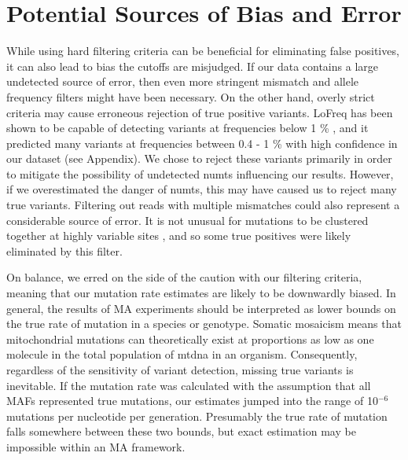 \documentclass[12pt,twoside]{reedthesis}
\begin{document}

\section{Potential Sources of Bias and Error}
While using hard filtering criteria can be beneficial for eliminating false positives, it can also lead to bias the cutoffs are misjudged.
If our data contains a large undetected source of error, then even more stringent mismatch and allele frequency filters might have been necessary.
On the other hand, overly strict criteria may cause erroneous rejection of true positive variants. 
LoFreq has been shown to be capable of detecting variants at frequencies below 1 \% \citep{wilm_lofreq:_2012, huang_evaluation_2015}, and it predicted many variants at frequencies between 0.4 - 1 \% with high confidence in our dataset (see Appendix). 
We chose to reject these variants primarily in order to mitigate the possibility of undetected \gls{numts} influencing our results.
However, if we overestimated the danger of \gls{numts}, this may have caused us to reject many true variants.
Filtering out reads with multiple mismatches could also represent a considerable source of error. 
It is not unusual for mutations to be clustered together at highly variable sites \citep{schrider_pervasive_2011}, and so some true positives were likely eliminated by this filter.

On balance, we erred on the side of the caution with our filtering criteria, meaning that our mutation rate estimates are likely to be downwardly biased.
In general, the results of \gls{MA} experiments should be interpreted as lower bounds on the true rate of mutation in a species or genotype.
Somatic mosaicism means that mitochondrial mutations can theoretically exist at proportions as low as one molecule in the total population of \gls{mtdna} in an organism.
Consequently, regardless of the sensitivity of variant detection, missing true variants is inevitable. 
If the mutation rate was calculated with the assumption that all MAFs represented true mutations, our estimates jumped into the range of 10$^{-6}$ mutations per nucleotide per generation.
Presumably the true rate of mutation falls somewhere between these two bounds, but exact estimation may be impossible within an \gls{MA} framework. 
\end{document}
